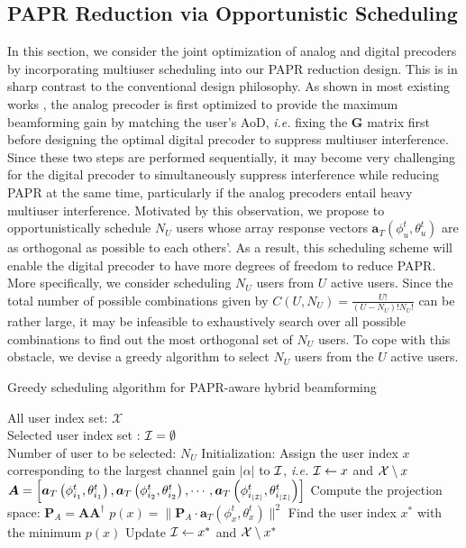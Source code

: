 \documentclass[conference]{IEEEtran}
\begin{document}
\subsection{PAPR Reduction via Opportunistic Scheduling}
In this section, we consider the joint optimization of analog and digital precoders by incorporating multiuser scheduling into our PAPR reduction design. This is in sharp contrast to the conventional design philosophy. As shown in most existing works \cite{alkhateeb2015limited}, the analog precoder is first optimized to provide the maximum beamforming gain by matching the user's AoD, {\em i.e.} fixing the ${\bm G}$ matrix first before designing the optimal digital precoder to suppress multiuser interference. Since these two steps are performed sequentially, it may become very challenging for the digital precoder to simultaneously suppress interference while reducing PAPR at the same time, particularly if the analog precoders entail heavy multiuser interference. Motivated by this observation, we propose to opportunistically schedule $N_U$ users whose array response vectors $\bm{a}_{T}(\phi^t_u,\theta^t_u)$ are as orthogonal as possible to each others'. As a result, this scheduling scheme will enable the digital precoder to have more degrees of freedom to reduce PAPR. More specifically, we consider scheduling $N_U$ users from $U$ active users. Since the total number of possible combinations given by $C\left(U, N_U\right)=\frac{U!}{(U-N_U)!N_U!}$ can be rather large, it may be infeasible to exhaustively search over all possible combinations to find out the most orthogonal set of $N_U$ users. To cope with this obstacle, we devise a greedy algorithm to select $N_U$ users from the $U$ active users.

\begin{algorithm}[h] 		
	\caption{Greedy scheduling algorithm for PAPR-aware hybrid beamforming}
	\label{selection}
	\begin{algorithmic}
		\REQUIRE  \quad
		\STATE	All user index set: $\mathcal{X}$\\
		\STATE  Selected user index set : $\cal{I}=\emptyset$\\
		\STATE  Number of user to be selected: $N_U$
		\ENSURE   	
		\STATE Initialization: Assign the user index $x$ corresponding to the largest channel gain $|\alpha|$ to ${\cal I}$, {\em i.e.} ${\cal I} \leftarrow  x$ and ${\cal X}\setminus x$	
		\STATE ${\bm A}=\left[\bm{a}_{T}\left(\phi^t_{i_1},\theta^t_{i_1}\right),\bm{a}_{T}\left(\phi^t_{i_2},\theta^t_{i_2}\right),\cdots,\bm{a}_{T}\left(\phi^t_{i_{|{\cal I}|}},\theta^t_{i_{|{\cal I}|}}\right)\right]$
		\STATE Compute the projection space: ${\bm P}_A = {\bm A}{\bm A}^{\dagger}$ 		 				
		\STATE $p(x) = \|{\bm P}_A\cdot {\bm a}_T\left(\phi^t_{x},\theta^t_{x}\right)\|^2$ 				 								
		\ENDFOR
		\STATE  Find the user index $x^*$ with the minimum $p(x)$ 									
		\STATE	Update ${\cal I} \leftarrow  x^*$ and ${\cal X}\setminus x^*$	
		\ENDWHILE	
	\end{algorithmic}
\end{algorithm}
\end{document}
